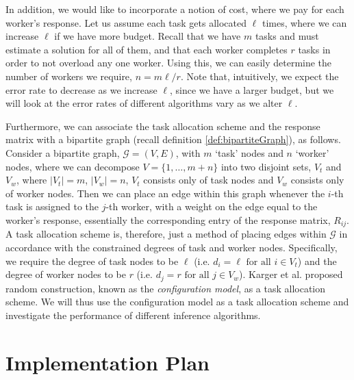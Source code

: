 \documentclass[12pt]{article}
\numberwithin{equation}{section}
\begin{document}
In addition, we would like to incorporate a notion of cost, where we pay for each worker's response. Let us assume each task gets allocated $\ell$ times, where we can increase $\ell$ if we have more budget. Recall that we have $m$ tasks and must estimate a solution for all of them, and that each worker completes $r$ tasks in order to not overload any one worker. Using this, we can easily determine the number of workers we require, $n = m\ell/r$. Note that, intuitively, we expect the error rate to decrease as we increase $\ell$, since we have a larger budget, but we will look at the error rates of different algorithms vary as we alter $\ell$.

Furthermore, we can associate the task allocation scheme and the response matrix with a bipartite graph (recall definition \ref{def:bipartiteGraph}), as follows. Consider a bipartite graph, $\mathcal{G} = (V,E)$, with $m$ `task' nodes and $n$ `worker' nodes, where we can decompose $V=\{1,\dots,m+n\}$ into two disjoint sets, $V_{t}$ and $V_{w}$, where $\left\vert{V_{t}}\right\vert = m$, $\left\vert{V_{w}}\right\vert = n$, $V_{t}$ consists only of task nodes and $V_{w}$ consists only of worker nodes. Then we can place an edge within this graph whenever the $i$-th task is assigned to the $j$-th worker, with a weight on the edge equal to the worker's response, essentially the corresponding entry of the response matrix, $R_{ij}$. A task allocation scheme is, therefore, just a method of placing edges within $\mathcal{G}$ in accordance with the constrained degrees of task and worker nodes. Specifically, we require the degree of task nodes to be $\ell$ (i.e. $d_{i} = \ell \text{ for all } i \in V_{t}$) and the degree of worker nodes to be $r$ (i.e. $d_{j} = r \text{ for all } j \in V_{w}$). Karger et al. \cite{KOS13} proposed random construction, known as the \textsl{configuration model}, as a task allocation scheme. We will thus use the configuration model as a task allocation scheme and investigate the performance of different inference algorithms.


\newpage
\thispagestyle{plain}
\mbox{}
\section {Implementation Plan}
\label{sec:implementationPlan}
\end{document}
